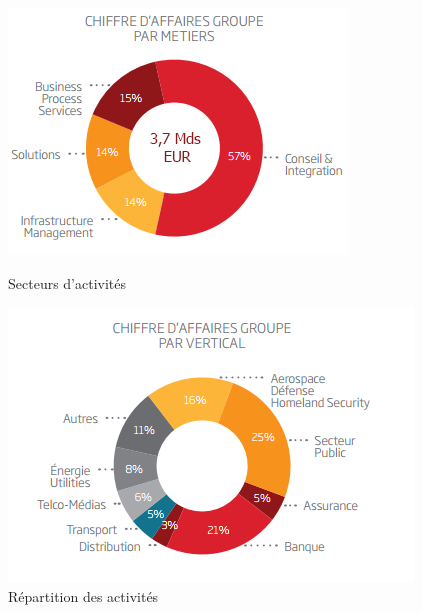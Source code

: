 \begin{figure}[h]
   \begin{minipage}[c]{.45\linewidth}
    \includegraphics[scale=0.9]{images/sopraSteriaMetiers.png}
	\centering
	\caption{Secteurs d'activités}
	\label{sopraSteriaActivites}
   \end{minipage} \hfill
   \begin{minipage}[c]{.45\linewidth}
    \includegraphics[scale=0.9]{images/sopraSteriaActivites.png}
	\centering
	\caption{Répartition des activités}
	\label{sopraSteriaActivites}
   \end{minipage}
\end{figure}
		